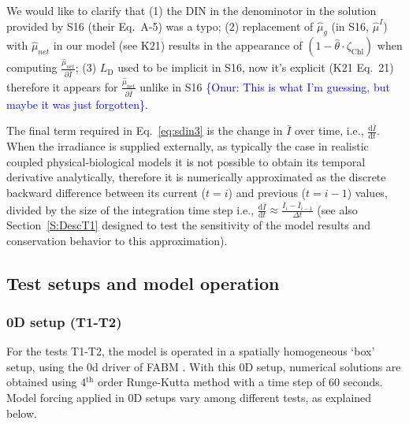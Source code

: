 \documentclass[gmd, manuscript, draft]{copernicus}
\newcommand{\onur}[1]{\textcolor{blue}{\{Onur: #1\}}}
\begin{document}
We would like to clarify that (1) the DIN in the denominotor in the solution provided by S16 (their Eq.~A-5) was a typo; (2) replacement of $\hat{\mu}_g$ (in S16, $\hat{\mu}^I$) with $\hat{\mu}_{net}$ in our model (see K21) results in the appearance of $(1-\hat{\theta} \cdot \zeta_{\text{Chl}})$ when computing $\frac{\hat{\mu}_{net}}{\partial \bar{I}}$; (3) $L_{\text{D}}$ used to be implicit in S16, now it's explicit (K21 Eq.~21) therefore it appears for $\frac{\hat{\mu}_{net}}{\partial \bar{I}}$ unlike in S16 \onur{This is what I'm guessing, but maybe it was just forgotten}. %

The final term required in Eq.~\eqref{eq:sdin3} is the change in $\bar{I}$ over time, i.e., $\frac{\text{d}\bar{I}}{\text{d}t}$. When the irradiance is supplied externally, as typically the case in realistic coupled physical-biological models it is not possible to obtain its temporal derivative analytically, therefore  it is numerically approximated as the discrete backward difference between its current ($t=i$) and previous ($t=i-1$) values, divided by the size of the integration time step i.e., $\frac{\text{d} \bar{I}}{\text{d} t} \approx \frac{\bar{I}_{i} - \bar{I}_{i-1}}{\Delta t}$ (see also Section~\ref{S:DescT1} designed to test the sensitivity of the model results and conservation behavior to this approximation).


\subsection{Test setups and model operation}\label{S:DescSetup}
\subsubsection{0D setup (T1-T2)}
    For the tests T1-T2, the model is operated in a spatially homogeneous `box' setup, using the 0d driver of FABM \citep{Bruggeman2014}. With this 0D setup, numerical solutions are obtained using 4$^\text{th}$ order Runge-Kutta method with a time step of 60 seconds. Model forcing applied in 0D setups vary among different tests, as explained below.
\end{document}
